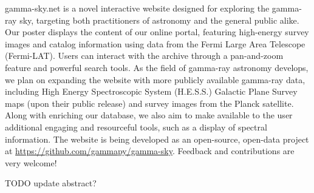 gamma-sky.net is a novel interactive website designed for exploring the gamma-ray sky,
targeting both practitioners of astronomy and the general public alike. Our poster displays the
content of our online portal, featuring high-energy survey images and catalog information using
data from the Fermi Large Area Telescope (Fermi-LAT).  Users can interact with the archive
through a pan-and-zoom feature and powerful search tools. As the field of gamma-ray astronomy
develops, we plan on expanding the website with more publicly available gamma-ray data,
including High Energy Spectroscopic System (H.E.S.S.) Galactic Plane Survey maps (upon their
public release) and survey images from the Planck satellite. Along with enriching our database,
we also aim to make available to the user additional engaging and resourceful tools, such as a
display of spectral information. The website is being developed as an open-source, open-data
project at \url{https://github.com/gammapy/gamma-sky}. Feedback and contributions are very
welcome!


TODO update abstract?
